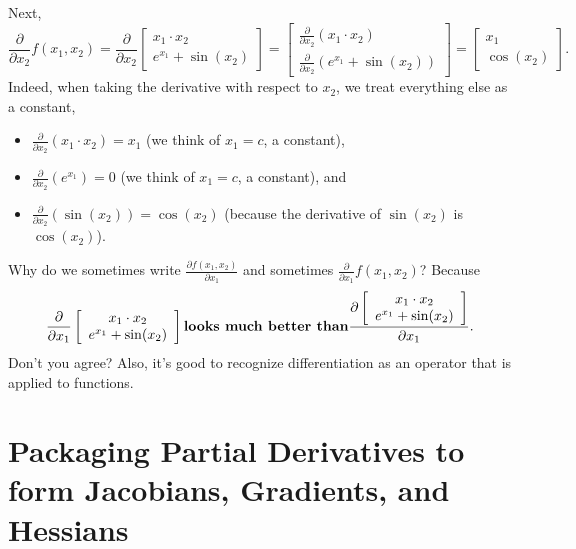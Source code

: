 Next,
\[
\frac{\partial}{\partial x_2} f(x_1, x_2) = \frac{\partial}{\partial x_2} \left[ \begin{array}{c} x_1 \cdot x_2 \\ e^{x_1} + \sin(x_2) \end{array}\right] =\left[ \begin{array}{l} \frac{\partial}{\partial x_2}( x_1 \cdot x_2) \\ \frac{\partial}{\partial x_2}(e^{x_1} + \sin(x_2)) \end{array}\right]= \left[ \begin{array}{c} x_1 \\ \cos(x_2)\end{array}\right].
\]
Indeed, when taking the derivative with respect to \(x_2\), we treat everything else as a constant,
\begin{itemize}
\item \(\frac{\partial}{\partial x_2}(x_1 \cdot x_2) = x_1\) (we think of \(x_1=c\), a constant),
\item \(\frac{\partial}{\partial x_2}(e^{x_1}) = 0\) (we think of \(x_1=c\), a constant), and
\item \(\frac{\partial}{\partial x_2}(\sin(x_2)) = \cos(x_2)\) (because the derivative of \(\sin(x_2)\) is \(\cos(x_2)\)).
\end{itemize}

\Qed

\begin{rem} Why do we sometimes write  \(\frac{\partial f(x_1, x_2)}{\partial x_1}\) and sometimes \(\frac{\partial}{\partial x_1} f(x_1, x_2)\)? Because
$$\frac{\partial}{\partial x_1} \left[ \begin{array}{c} x_1 \cdot x_2 \\ e^{x_1} + \sin(x_2) \end{array}\right]
\text{\bf looks much better than} \frac{\partial \left[ \begin{array}{c} x_1 \cdot x_2 \\ e^{x_1} + \sin(x_2) \end{array}\right]}{ \partial x_1}.$$       
Don't you agree? Also, it's good to recognize differentiation as an operator that is applied to functions.
\Qed
\end{rem}


\section{Packaging Partial Derivatives to form Jacobians, Gradients, and Hessians}
\label{sec:PackagingPartialDerivatives}

